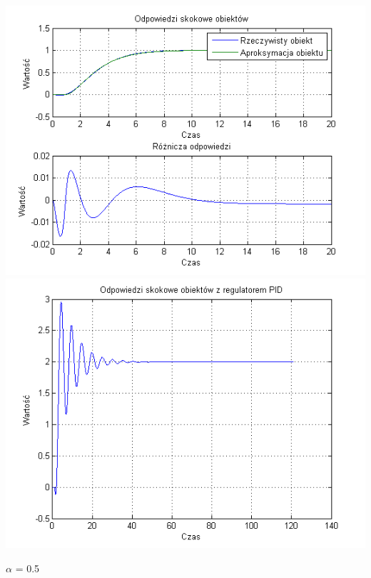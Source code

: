 \documentclass[10pt,a4paper]{article}
\begin{document}
\begin{center}
\includegraphics[scale=1]{images/dwa/skrypt_231.png}\\
\includegraphics[scale=1]{images/dwa/skrypt_232.png}\\
\end{center}
\newpage
$\alpha$ = 0.5
\end{document}
